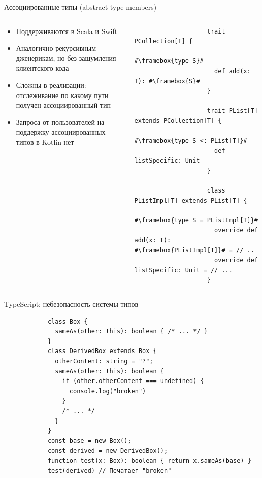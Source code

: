 \documentclass[aspectratio=169,usenames,dvipsnames]{beamer}
\begin{document}
    \begin{frame}[fragile]{Ассоциированные типы (abstract type members)}
        \begin{columns}[onlytextwidth]
            \begin{column}[t]{0.40\textwidth}
                \begin{itemize}
                    \item Поддерживаются в Scala и Swift
                    \item Аналогично рекурсивным дженерикам, но без зашумления клиентского кода
                    \item Сложны в реализации: отслеживание по какому пути получен ассоциированный тип
                    \item Запроса от пользователей на поддержку ассоциированных типов в Kotlin нет
                \end{itemize}
            \end{column}\hfill%
            \begin{column}[t]{0.58\textwidth}
                \begin{verbatim}
                    trait PCollection[T] {
                      #\framebox{type S}#
                      def add(x: T): #\framebox{S}#
                    }

                    trait PList[T] extends PCollection[T] {
                      #\framebox{type S <: PList[T]}#
                      def listSpecific: Unit
                    }

                    class PListImpl[T] extends PList[T] {
                      #\framebox{type S = PListImpl[T]}#
                      override def add(x: T): #\framebox{PListImpl[T]}# = // ..
                      override def listSpecific: Unit = // ...
                    }
                \end{verbatim}
            \end{column}
        \end{columns}
    \end{frame}

    \begin{frame}[fragile]{TypeScript: небезопасность системы типов}
        \begin{verbatim}
            class Box {
              sameAs(other: this): boolean { /* ... */ }
            }
            class DerivedBox extends Box {
              otherContent: string = "?";
              sameAs(other: this): boolean {
                if (other.otherContent === undefined) {
                  console.log("broken")
                }
                /* ... */
              }
            }
            const base = new Box();
            const derived = new DerivedBox();
            function test(x: Box): boolean { return x.sameAs(base) }
            test(derived) // Печатает "broken"
        \end{verbatim}
    \end{frame}
\end{document}
